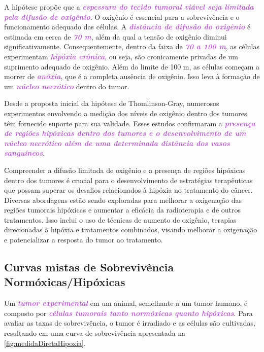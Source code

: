 \documentclass[11pt,a4paper]{article}
\begin{document}
	A hipótese propõe que a \textcolor{MediumOrchid}{\textbf{\textit{espessura do tecido tumoral viável seja limitada pela difusão de oxigênio}}}. O oxigênio é essencial para a sobrevivência e o funcionamento adequado das células. A \textcolor{MediumOrchid}{\textbf{\textit{distância de difusão do oxigênio}}} é estimada em cerca de \textcolor{MediumOrchid}{\textbf{\textit{70 \mu m}}}, além da qual a tensão de oxigênio diminui significativamente. Consequentemente, dentro da faixa de \textcolor{MediumOrchid}{\textbf{\textit{70 a 100 \mu m}}}, as células experimentam \textcolor{MediumOrchid}{\textbf{\textit{hipóxia crônica}}}, ou seja, são cronicamente privadas de um suprimento adequado de oxigênio. Além do limite de 100 \mu m, as células começam a morrer de \textcolor{MediumOrchid}{\textbf{\textit{anóxia}}}, que é a completa ausência de oxigênio. Isso leva à formação de um \textcolor{MediumOrchid}{\textbf{\textit{núcleo necrótico}}} dentro do tumor.

	Desde a proposta inicial da hipótese de Thomlinson-Gray, numerosos experimentos envolvendo a medição dos níveis de oxigênio dentro dos tumores têm fornecido suporte para sua validade. Esses estudos confirmaram a \textcolor{MediumOrchid}{\textbf{\textit{presença de regiões hipóxicas dentro dos tumores e o desenvolvimento de um núcleo necrótico além de uma determinada distância dos vasos sanguíneos}}}.

	Compreender a difusão limitada de oxigênio e a presença de regiões hipóxicas dentro dos tumores é crucial para o desenvolvimento de estratégias terapêuticas que possam superar os desafios relacionados à hipóxia no tratamento do câncer. Diversas abordagens estão sendo exploradas para melhorar a oxigenação das regiões tumorais hipóxicas e aumentar a eficácia da radioterapia e de outros tratamentos. Isso inclui o uso de técnicas de aumento de oxigênio, terapias direcionadas à hipóxia e tratamentos combinados, visando melhorar a oxigenação e potencializar a resposta do tumor ao tratamento.

\subsection*{Curvas mistas de Sobrevivência Normóxicas/Hipóxicas}

	Um \textcolor{MediumOrchid}{\textbf{\textit{tumor experimental}}} em um animal, semelhante a um tumor humano, é composto por \textcolor{MediumOrchid}{\textbf{\textit{células tumorais tanto normóxicas quanto hipóxicas}}}. Para avaliar as taxas de sobrevivência, o tumor é irradiado e as células são cultivadas, resultando em uma curva de sobrevivência apresentada na \ref{fig:medidaDiretaHipoxia}.
\end{document}

